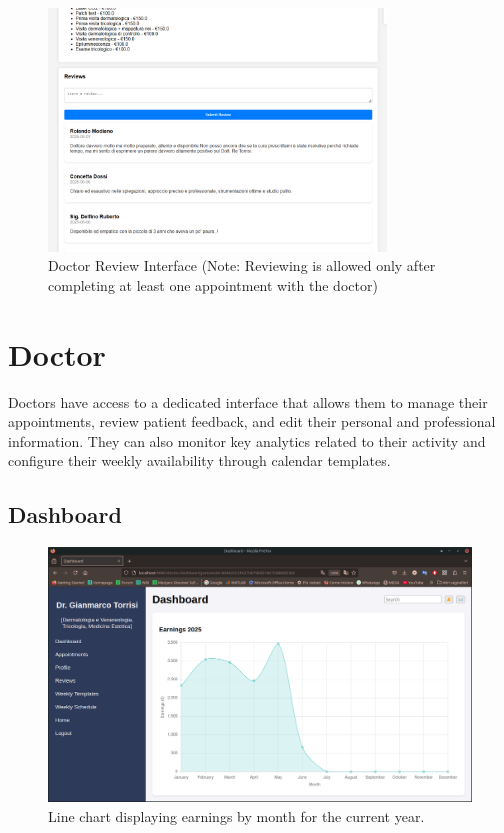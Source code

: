 \begin{figure}[H]
	\centering
	\includegraphics[width=0.8\textwidth]{resources/screenshots/patient_ui/review-doctor.png}
	\caption{Doctor Review Interface (Note: Reviewing is allowed only after completing at least one appointment with the doctor)}
	\label{fig:review-doctor}
\end{figure}

\section{Doctor}

Doctors have access to a dedicated interface that allows them to manage their appointments, review patient feedback, and edit their personal and professional information. They can also monitor key analytics related to their activity and configure their weekly availability through calendar templates.

\subsection{Dashboard}

\begin{figure}[!h]
	\centering
	\includegraphics[scale=0.30]{resources/screenshots/doctor_ui/earnings_linechart.png}
	\caption{Line chart displaying earnings by month for the current year.}
	\label{fig:earnings_linechart}
\end{figure}

